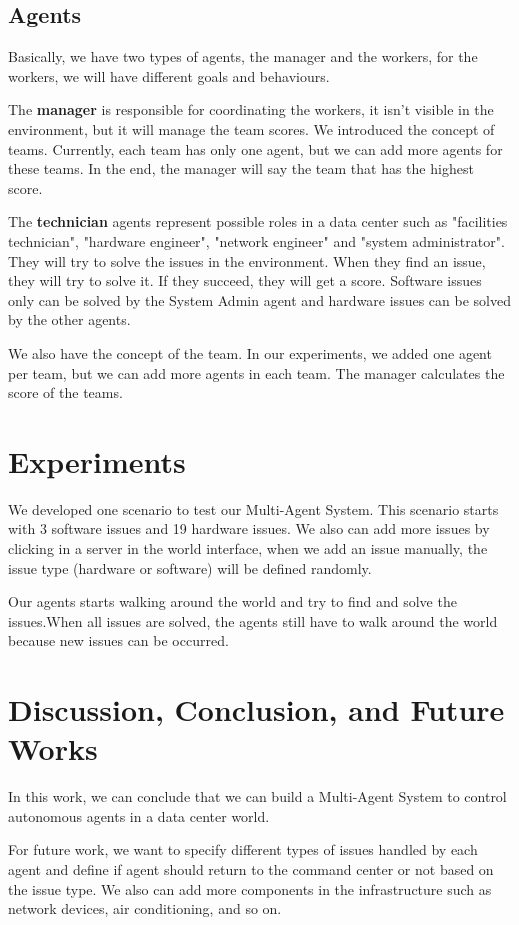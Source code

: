 \documentclass[letterpaper]{article}
\begin{document}
\subsection{Agents}

Basically, we have two types of agents, the manager and the workers, for the workers, we will have different goals and behaviours.

The \textbf{manager} is responsible for coordinating the workers, it isn't visible in the environment, but it will manage the team scores. We introduced the concept of teams. Currently, each team has only one agent, but we can add more agents for these teams. In the end, the manager will say the team that has the highest score.

The \textbf{technician} agents represent possible roles in a data center such as "facilities technician", "hardware engineer", "network engineer" and "system administrator". They will try to solve the issues in the environment. When they find an issue, they will try to solve it. If they succeed, they will get a score. Software issues only can be solved by the System Admin agent and hardware issues can be solved by the other agents.

We also have the concept of the team. In our experiments, we added one agent per team, but we can add more agents in each team. The manager calculates the score of the teams.

\section{Experiments}\label{sec:experiments}

We developed one scenario to test our Multi-Agent System. This scenario starts with 3 software issues and 19 hardware issues. We also can add more issues by clicking in a server in the world interface, when we add an issue manually, the issue type (hardware or software) will be defined randomly.

Our agents starts walking around the world and try to find and solve the issues.When all issues are solved, the agents still have to walk around the world because new issues can be occurred.

\section{Discussion, Conclusion, and Future Works}\label{sec:conclusions}

In this work, we can conclude that we can build a Multi-Agent System to control autonomous agents in a data center world.

For future work, we want to specify different types of issues handled by each agent and define if agent should return to the command center or not based on the issue type. We also can add more components in the infrastructure such as network devices, air conditioning, and so on.



\end{document}
